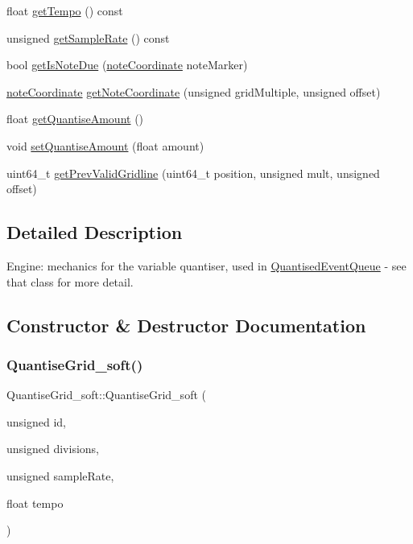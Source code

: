 \begin{DoxyCompactItemize}
\item 
float \mbox{\hyperlink{classQuantiseGrid__soft_a180347e39b8a4435d09d4d30aa1267b3}{get\+Tempo}} () const
\item 
unsigned \mbox{\hyperlink{classQuantiseGrid__soft_a190c0df68580479a199aafa0cdac03ec}{get\+Sample\+Rate}} () const
\item 
bool \mbox{\hyperlink{classQuantiseGrid__soft_a2401437abd3a1c44c536cf3a23d16fc6}{get\+Is\+Note\+Due}} (\mbox{\hyperlink{structQuantiseGrid__soft_1_1noteCoordinate}{note\+Coordinate}} note\+Marker)
\item 
\mbox{\hyperlink{structQuantiseGrid__soft_1_1noteCoordinate}{note\+Coordinate}} \mbox{\hyperlink{classQuantiseGrid__soft_a7831011191c8f3aae5bbe02105599b56}{get\+Note\+Coordinate}} (unsigned grid\+Multiple, unsigned offset)
\item 
float \mbox{\hyperlink{classQuantiseGrid__soft_a405d013660b0e43f838f384810118e94}{get\+Quantise\+Amount}} ()
\item 
void \mbox{\hyperlink{classQuantiseGrid__soft_a229b51ec1d81751479eeb7e6418f092a}{set\+Quantise\+Amount}} (float amount)
\item 
uint64\+\_\+t \mbox{\hyperlink{classQuantiseGrid__soft_a41e868ae0c1092b300086eb3b6aa2506}{get\+Prev\+Valid\+Gridline}} (uint64\+\_\+t position, unsigned mult, unsigned offset)
\end{DoxyCompactItemize}


\subsection{Detailed Description}
Engine\+: mechanics for the variable quantiser, used in \mbox{\hyperlink{classQuantisedEventQueue}{Quantised\+Event\+Queue}} -\/ see that class for more detail. 

\subsection{Constructor \& Destructor Documentation}
\mbox{\label{classQuantiseGrid__soft_ab40cf2cb17e78f06519e2aedd8022f8a}} 
\subsubsection{\texorpdfstring{Quantise\+Grid\+\_\+soft()}{QuantiseGrid\_soft()}}
{\footnotesize\ttfamily Quantise\+Grid\+\_\+soft\+::\+Quantise\+Grid\+\_\+soft (\begin{DoxyParamCaption}\item[{unsigned}]{id,  }\item[{unsigned}]{divisions,  }\item[{unsigned}]{sample\+Rate,  }\item[{float}]{tempo }\end{DoxyParamCaption})}



